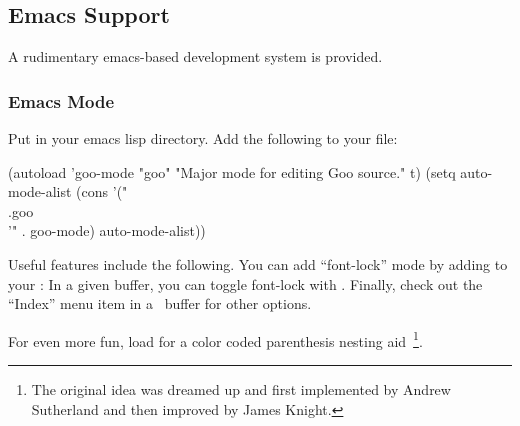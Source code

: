 \documentclass[twoside,twocolumn,9pt]{extarticle}
\begin{document}
% 
% 
% 
% 

\subsection{Emacs Support}

A rudimentary emacs-based development system is provided.

\subsubsection{Emacs Mode}

Put  in your emacs lisp directory.  Add the following to
your  file:

\begin{exv}
(autoload 'goo-mode "goo" "Major mode for editing Goo source." t)
(setq auto-mode-alist
      (cons '("\\.goo\\'" . goo-mode) auto-mode-alist))
\end{exv}

Useful features include the following.
You can add ``font-lock'' mode by adding 
 to your :
In a given buffer, you can toggle font-lock with .
Finally, check out the ``Index'' menu item in a \goo\ buffer for other
options.

For even more fun, load  for a color
coded parenthesis nesting aid~\footnote{The original idea was dreamed
up and first implemented by Andrew Sutherland and then improved by
James Knight.}.
\end{document}
